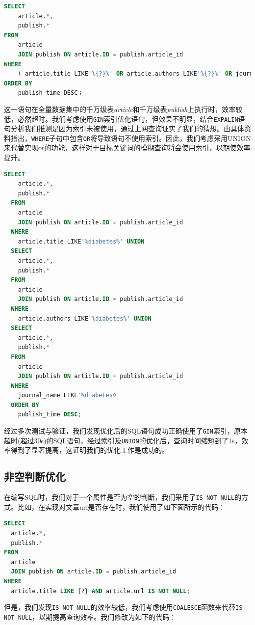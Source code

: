 \documentclass[UTF8,openany]{ctexbook}
\begin{document}
\begin{lstlisting}[language=sql]
SELECT
	article.*,
	publish.* 
FROM
	article
	JOIN publish ON article.ID = publish.article_id 
WHERE
	( article.title LIKE'%{?}%' OR article.authors LIKE'%{?}%' OR journal_name LIKE'%{?}%' ) 
ORDER BY
	publish_time DESC；
\end{lstlisting}

这一语句在全量数据集中的千万级表\textit{article}和千万级表\textit{publish}上执行时，效率较低，必然超时。我们考虑使用\texttt{GIN}索引优化语句，但效果不明显，结合\texttt{EXPALIN}语句分析我们推测是因为索引未被使用，通过上网查询证实了我们的猜想。由具体资料指出，\texttt{WHERE}子句中包含\texttt{OR}将导致语句不使用索引。因此，我们考虑采用UNION来代替实现or的功能，这样对于目标关键词的模糊查询将会使用索引，以期使效率提升。

\begin{lstlisting}[language=sql]
    SELECT
    article.*,
    publish.* 
  FROM
    article
    JOIN publish ON article.ID = publish.article_id 
  WHERE
    article.title LIKE'%diabetes%' UNION
  SELECT
    article.*,
    publish.* 
  FROM
    article
    JOIN publish ON article.ID = publish.article_id 
  WHERE
    article.authors LIKE'%diabetes%' UNION
  SELECT
    article.*,
    publish.* 
  FROM
    article
    JOIN publish ON article.ID = publish.article_id 
  WHERE
    journal_name LIKE'%diabetes%' 
  ORDER BY
    publish_time DESC;
\end{lstlisting}

经过多次测试与验证，我们发现优化后的SQL语句成功正确使用了\texttt{GIN}索引，原本超时(超过30s)的SQL语句，经过索引及\texttt{UNION}的优化后，查询时间缩短到了1s，效率得到了显著提高，这证明我们的优化工作是成功的。

\subsection{非空判断优化}

在编写SQL时，我们对于一个属性是否为空的判断，我们采用了\texttt{IS NOT NULL}的方式。比如，在实现对文章url是否存在时，我们使用了如下面所示的代码：

\begin{lstlisting}[language=sql]
SELECT
  article.*,
  publish.* 
FROM
  article
  JOIN publish ON article.ID = publish.article_id 
WHERE
  article.title LIKE {?} AND article.url IS NOT NULL;
\end{lstlisting}

但是，我们发现\texttt{IS NOT NULL}的效率较低，我们考虑使用\texttt{COALESCE}函数来代替\texttt{IS NOT NULL}，以期提高查询效率。我们修改为如下的代码：
\end{document}
